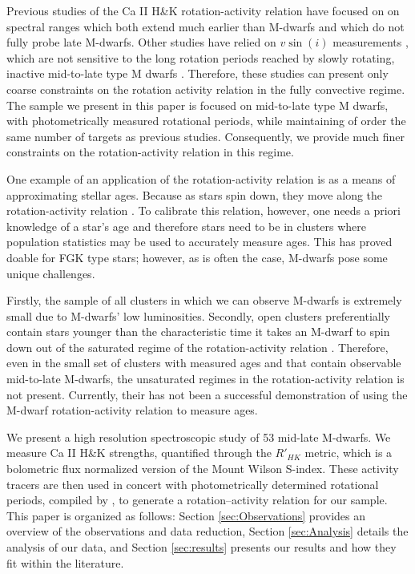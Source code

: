 Previous studies of the Ca II H\&K rotation-activity relation
\citep[e.g.][]{Vau81, Sua15, Def17, Hou17} have focused on on spectral ranges
which both extend much earlier than M-dwarfs and which do not fully probe late
M-dwarfs. Other studies have relied on $v\sin(i)$ measurements
\citep[e.g.][]{Browning2010, Hou17}, which are not sensitive to the long
rotation periods reached by slowly rotating, inactive mid-to-late type M dwarfs
\citep[70-150 days:][]{Newton2016}. Therefore, these studies can present only
coarse constraints on the rotation activity relation in the fully convective
regime. The sample we present in this paper is focused on mid-to-late type M
dwarfs, with photometrically measured rotational periods, while maintaining of
order the same number of targets as previous studies.  Consequently, we provide
much finer constraints on the rotation-activity relation in this regime. 

One example of an application of the rotation-activity relation is as a means
of approximating stellar ages. Because as stars spin down, they move along
the rotation-activity relation \citep{Soderblom1991}. To calibrate this
relation, however, one needs a priori knowledge of a star's age and therefore
stars need to be in clusters where population statistics may be used to
accurately measure ages. This has proved doable for FGK type stars; however,
as is often the case, M-dwarfs pose some unique challenges. 

Firstly, the sample of all clusters in which we can observe M-dwarfs is
extremely small due to M-dwarfs' low luminosities. Secondly, open clusters
preferentially contain stars younger than the characteristic time it takes an
M-dwarf to spin down out of the saturated regime of the rotation-activity
relation \citep{West2009, Newton2016, Giacobbe2020}. Therefore, even in the
small set of clusters with measured ages and that contain observable
mid-to-late M-dwarfs, the unsaturated regimes in the rotation-activity
relation is not present. Currently, their has not been a successful
demonstration of using the M-dwarf rotation-activity relation to measure
ages.

We present a high resolution spectroscopic study of 53 mid-late M-dwarfs. We
measure Ca II H\&K strengths, quantified through the $R'_{HK}$ metric, which is
a bolometric flux normalized version of the Mount Wilson S-index. These
activity tracers are then used in concert with photometrically determined
rotational periods, compiled by \citet{Newton2017}, to generate a
rotation--activity relation for our sample. This paper is organized as follows:
Section \ref{sec:Observations} provides an overview of the observations and
data reduction, Section \ref{sec:Analysis} details the analysis of our data,
and Section \ref{sec:results} presents our results and how they fit within the
literature. 
